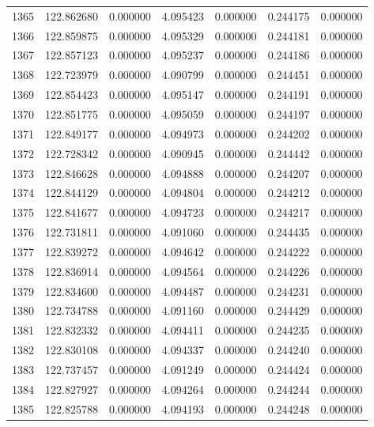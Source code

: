 \begin{tabular}{rrrrrrr}
1365 & 122.862680 &    0.000000 &  4.095423 &   0.000000 &   0.244175 &  0.000000 \\
1366 & 122.859875 &    0.000000 &  4.095329 &   0.000000 &   0.244181 &  0.000000 \\
1367 & 122.857123 &    0.000000 &  4.095237 &   0.000000 &   0.244186 &  0.000000 \\
1368 & 122.723979 &    0.000000 &  4.090799 &   0.000000 &   0.244451 &  0.000000 \\
1369 & 122.854423 &    0.000000 &  4.095147 &   0.000000 &   0.244191 &  0.000000 \\
1370 & 122.851775 &    0.000000 &  4.095059 &   0.000000 &   0.244197 &  0.000000 \\
1371 & 122.849177 &    0.000000 &  4.094973 &   0.000000 &   0.244202 &  0.000000 \\
1372 & 122.728342 &    0.000000 &  4.090945 &   0.000000 &   0.244442 &  0.000000 \\
1373 & 122.846628 &    0.000000 &  4.094888 &   0.000000 &   0.244207 &  0.000000 \\
1374 & 122.844129 &    0.000000 &  4.094804 &   0.000000 &   0.244212 &  0.000000 \\
1375 & 122.841677 &    0.000000 &  4.094723 &   0.000000 &   0.244217 &  0.000000 \\
1376 & 122.731811 &    0.000000 &  4.091060 &   0.000000 &   0.244435 &  0.000000 \\
1377 & 122.839272 &    0.000000 &  4.094642 &   0.000000 &   0.244222 &  0.000000 \\
1378 & 122.836914 &    0.000000 &  4.094564 &   0.000000 &   0.244226 &  0.000000 \\
1379 & 122.834600 &    0.000000 &  4.094487 &   0.000000 &   0.244231 &  0.000000 \\
1380 & 122.734788 &    0.000000 &  4.091160 &   0.000000 &   0.244429 &  0.000000 \\
1381 & 122.832332 &    0.000000 &  4.094411 &   0.000000 &   0.244235 &  0.000000 \\
1382 & 122.830108 &    0.000000 &  4.094337 &   0.000000 &   0.244240 &  0.000000 \\
1383 & 122.737457 &    0.000000 &  4.091249 &   0.000000 &   0.244424 &  0.000000 \\
1384 & 122.827927 &    0.000000 &  4.094264 &   0.000000 &   0.244244 &  0.000000 \\
1385 & 122.825788 &    0.000000 &  4.094193 &   0.000000 &   0.244248 &  0.000000 \\

\end{tabular}
